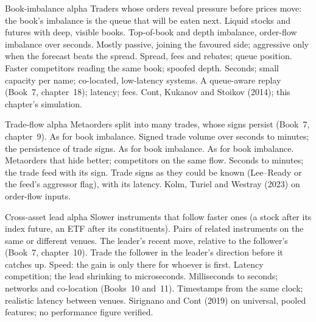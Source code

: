 \begin{strategyfile}{Book-imbalance alpha}\label{strat:s1:intraday-machine-learned-alphas:book}
 Traders whose orders reveal pressure before prices move: the book's imbalance is the queue that will be eaten next.
 Liquid stocks and futures with deep, visible books.
 Top-of-book and depth imbalance, order-flow imbalance over seconds.
 Mostly passive, joining the favoured side; aggressive only when the forecast beats the spread.
 Spread, fees and rebates; queue position.
 Faster competitors reading the same book; spoofed depth.
 Seconds; small capacity per name; co-located, low-latency systems.
 A queue-aware replay (Book~7, chapter~18); latency; fees.
 Cont, Kukanov and Stoikov (2014); this chapter's simulation.
\end{strategyfile}

\begin{strategyfile}{Trade-flow alpha}\label{strat:s1:intraday-machine-learned-alphas:flow}
 Metaorders split into many trades, whose signs persist (Book~7, chapter~9).
 As for book imbalance.
 Signed trade volume over seconds to minutes; the persistence of trade signs.
 As for book imbalance.
 As for book imbalance.
 Metaorders that hide better; competitors on the same flow.
 Seconds to minutes; the trade feed with its sign.
 Trade signs as they could be known (Lee--Ready or the feed's aggressor flag), with its latency.
 Kolm, Turiel and Westray (2023) on order-flow inputs.
\end{strategyfile}

\begin{strategyfile}{Cross-asset lead alpha}\label{strat:s1:intraday-machine-learned-alphas:lead}
 Slower instruments that follow faster ones (a stock after its index future, an ETF after its constituents).
 Pairs of related instruments on the same or different venues.
 The leader's recent move, relative to the follower's (Book~7, chapter~10).
 Trade the follower in the leader's direction before it catches up.
 Speed: the gain is only there for whoever is first.
 Latency competition; the lead shrinking to microseconds.
 Milliseconds to seconds; networks and co-location (Books~10 and~11).
 Timestamps from the same clock; realistic latency between venues.
 Sirignano and Cont (2019) on universal, pooled features; no performance figure verified.
\end{strategyfile}

